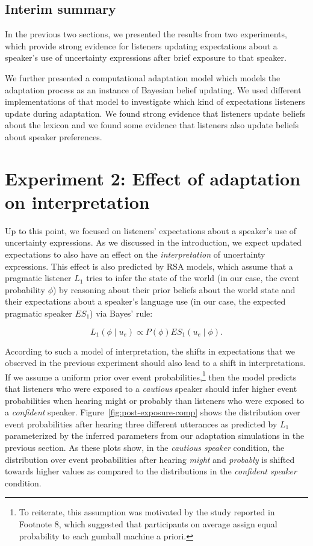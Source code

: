 \documentclass[man, floatsintext]{apa6}
\begin{document}
\subsection{Interim summary}

In the previous two sections, we presented the results from two experiments, which provide strong evidence for
listeners updating expectations about a speaker's use of uncertainty expressions after brief
exposure to that speaker. 

We further presented a computational adaptation model which models the adaptation
process as an instance of Bayesian belief updating. We used different implementations
of that model to investigate which kind of expectations listeners update during adaptation.
We found strong evidence that listeners update beliefs about the lexicon and 
we found some evidence that
listeners also update beliefs about speaker preferences.

\section{Experiment 2: Effect of adaptation on interpretation}
\label{sec:exp-model-interpretation}


Up to this point, we focused on listeners' expectations about a speaker's use of uncertainty expressions. As we discussed
in the introduction, we expect updated expectations to also have an effect on the \emph{interpretation} of uncertainty expressions. This
effect is also predicted by RSA models,  which assume that a pragmatic listener $L_1$ tries to infer the state of the world (in our case, the event probability $\phi$) by reasoning
about their prior beliefs about the world state and their expectations about a speaker's language use (in our case, the expected pragmatic speaker $ES_{1}$) via Bayes' rule:

$$ L_1(\phi \mid u_e) \propto P(\phi) ES_1(u_e \mid \phi).$$

According to such a model of interpretation, the shifts in expectations that we observed in the previous experiment should also lead to a shift in interpretations. 
If we assume a uniform prior over event probabilities,\footnote{To reiterate, this assumption was motivated by the study reported in Footnote 8, which suggested that participants on average assign equal probability to each gumball machine a priori.} then the model predicts that listeners who were exposed to a \textit{cautious} speaker should infer 
higher event probabilities when hearing {\sc might} or {\sc probably} than listeners who were exposed to a \textit{confident} speaker. Figure~\ref{fig:post-exposure-comp}
shows the distribution over event probabilities after hearing three different utterances as predicted by $L_1$ parameterized by the inferred parameters from our
adaptation simulations in the previous section. As these plots show, in the \textit{cautious speaker} condition, the distribution over event probabilities after hearing \textit{might} 
and \textit{probably} is shifted towards higher values as compared to the distributions in the \textit{confident speaker} condition. 
\end{document}
